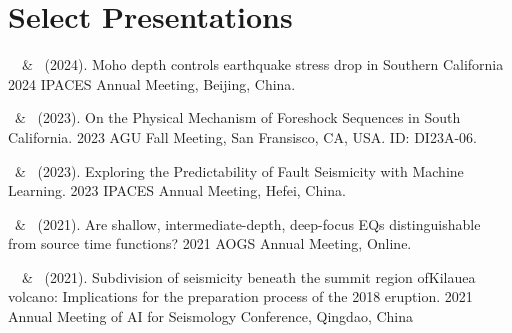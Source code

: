 \section{Select Presentations}


\begin{etaremune}
\item
    \Me\, \ZLi\ \& \SMa\ (2024).
    Moho depth controls earthquake stress drop in Southern California
    2024 IPACES Annual Meeting, Beijing, China.

\item
    \Me\ \& \ZLi\   (2023).
    On the Physical Mechanism of Foreshock Sequences in South California.
    2023 AGU Fall Meeting, San Fransisco, CA, USA. ID: DI23A-06.

\item
    \Me\ \& \ZLi\   (2023).
    Exploring the Predictability of Fault Seismicity with Machine Learning.
    2023 IPACES Annual Meeting, Hefei, China.

\item
    \Me\ \& \ZLi\ (2021).
    Are shallow, intermediate-depth, deep-focus EQs distinguishable from source time functions? 
    2021 AOGS Annual Meeting, Online.

\item
    \Me\, \ZLi\ \& \HHuang\ (2021).
    Subdivision of seismicity beneath the summit region ofKilauea volcano: Implications for the preparation process of the 2018 eruption.
    2021 Annual Meeting of AI for Seismology Conference, Qingdao, China

\end{etaremune}
